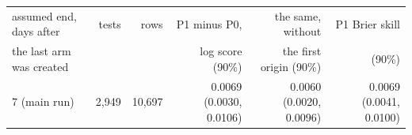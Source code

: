 \begin{tabular}{lrrrrr}
\toprule
assumed end, days after & tests & rows & P1 minus P0, & the same, without & P1 Brier skill \\
the last arm was created & & & log score (90\%) & the first origin (90\%) & (90\%) \\
\midrule
7 (main run) & 2,949 & 10,697 & 0.0069 (0.0030, 0.0106) & 0.0060 (0.0020, 0.0096) & 0.0069 (0.0041, 0.0100) \\

\end{tabular}
